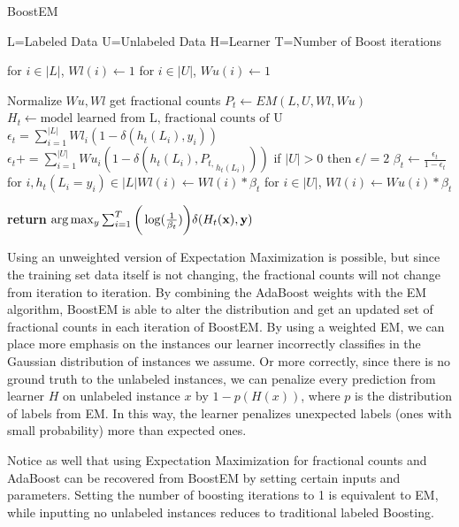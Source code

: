 \documentclass{sig-alternate}
\begin{document}
\begin{algorithm}
\caption{BoostEM}\label{euclid}
\begin{algorithmic}[1]
\State L=Labeled Data
\State U=Unlabeled Data
\State H=Learner
\State T=Number of Boost iterations

\State for $i \in |L|$, $ Wl(i) \gets 1$
\State for $i \in |U|$, $ Wu(i) \gets 1$

\State Normalize $Wu,Wl$
\State get fractional counts $P_{t} \gets EM(L,U,Wl,Wu)$
\State $H_{t} \gets \text{model learned from L, fractional counts of U}$
\State $\epsilon_{t} = \sum_{i=1}^{|L|} Wl_{i}(1-\delta(h_{t}(L_{i}),y_{i}))$
\State $\epsilon_{t} += \sum_{i=1}^{|U|} Wu_{i}(1-\delta(h_{t}(L_{i}),{P_{t,}}_{h_{t}(L_{i})}))$
\State if $|U| > 0$ then $\epsilon /= 2$
\State $\beta_{t} \gets \frac{\epsilon_{t}}{1-\epsilon_{t}}$
\State for $i,h_{t}(L_{i} = y_{i}) \in |L| Wl(i) \gets Wl(i)*\beta_{t}$
\State for $i \in |U|$, $Wl(i) \gets Wu(i)*\beta_{t}$

\EndFor
\State \textbf{return} $\arg \max_{y} \sum_{i=1}^{T}\bigg(\log(\frac{1}{\beta_{t}})\bigg) \delta(H_{t}(\bf{x}),y)$
\EndProcedure
\end{algorithmic}
\end{algorithm}

 Using an unweighted version of Expectation Maximization is possible, but since the training set data itself is not changing, the fractional counts will not change from iteration to iteration. By combining the AdaBoost weights with the EM algorithm, BoostEM is able to alter the distribution and get an updated set of fractional counts in each iteration of BoostEM.   By using a weighted EM, we can place more emphasis on the instances our learner incorrectly classifies in the Gaussian distribution of instances we assume. Or more correctly, since there is no ground truth to the unlabeled instances, we can penalize every prediction from learner $H$ on unlabeled instance $x$ by $1-p(H(x))$, where $p$ is the distribution of labels from EM.  In this way, the learner penalizes unexpected labels (ones with small probability) more than expected ones.

Notice as well that using Expectation Maximization for fractional counts and AdaBoost can be recovered from BoostEM by setting certain inputs and parameters.  Setting the number of boosting iterations to 1 is equivalent to EM, while inputting no unlabeled instances reduces to traditional labeled Boosting.    
    
\end{document}
